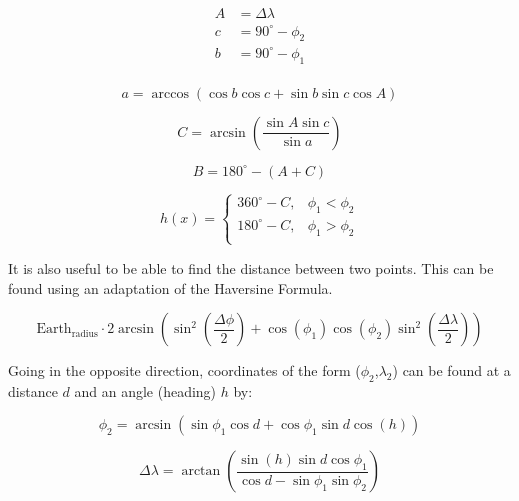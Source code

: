 \documentclass[12pt]{article}
\begin{document}
\begin{equation}
\begin{aligned}
A &=\Delta \lambda \\
c &=90^\circ - \phi_2 \\
b &=90^\circ - \phi_1 \\
\end{aligned}
\end{equation}

\begin{equation}
a = \arccos{(\cos{b}\cos{c} + \sin{b}\sin{c}\cos{A})}
\end{equation}

\begin{equation}
C =\arcsin{\left( \frac{\sin{A}\sin{c}}{\sin{a}} \right)}
\end{equation}

\begin{equation}
B = 180^\circ - (A + C)
\end{equation}

\begin{equation}
h(x) = \begin{cases}
  360^\circ - C, & \phi_1<\phi_2 \\
  180^\circ - C, & \phi_1>\phi_2 \\
\end{cases}
\end{equation}

It is also useful to be able to find the distance between two points.  This can be found using an adaptation of the Haversine Formula.

\begin{equation}
\text{Earth}_\text{radius}\cdot 2\arcsin\left(\sin^2{\left(\frac{\Delta \phi}{2}\right)} + \cos(\phi_1)\cos(\phi_2)\sin^2\left(\frac{\Delta \lambda}{2}\right)\right)
\end{equation}

Going in the opposite direction, coordinates of the form ($\phi_2$,$\lambda_2$) can be found at a distance $d$ and an angle (heading) $h$ by:


\begin{equation}
\label{great-circle-coords-lat}
\phi_2 = \arcsin(\sin\phi_1\cos{d}+\cos\phi_1\sin d\cos(h))
\end{equation}

\begin{equation}
\label{great-circle-coords-dlon}
\Delta\lambda = \arctan\left(\frac{\sin(h)\sin d\cos\phi_1}{\cos d-\sin\phi_1\sin\phi_2}\right)
\end{equation}
\end{document}
